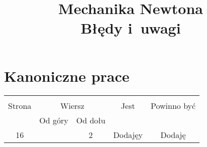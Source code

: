\documentclass[a4paper,11pt]{article}
\title{Mechanika Newtona \\
  Błędy i~uwagi}
\begin{document}





\maketitle %





\section{Kanoniczne prace}

\vspace{\spaceThree}







\begin{center}

  \begin{tabular}{|c|c|c|c|c|}
    \hline
    & \multicolumn{2}{c|}{} & & \\
    Strona & \multicolumn{2}{c|}{Wiersz} & Jest
                              & Powinno być \\ \cline{2-3}
    & Od góry & Od dołu & & \\
    \hline
    16  & &  2 & Dodajęy & Dodaję \\
    \hline
  \end{tabular}

\end{center}


\vspace{\spaceTwo}
\end{document}
